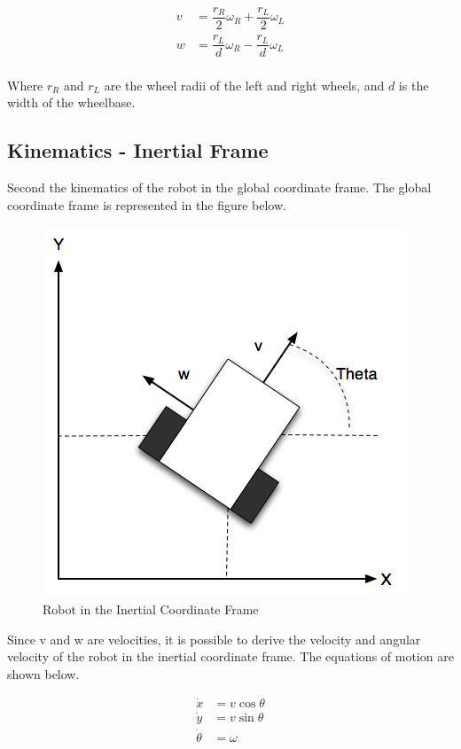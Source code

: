 \documentclass[10pt]{amsart}
\begin{document}
\begin{equation}
  \begin{aligned}
    v &= \dfrac{r_R}{2} \omega_R + \dfrac{r_L}{2} \omega_L \\
    w &= \dfrac{r_L}{d} \omega_R - \dfrac{r_L}{d} \omega_L
  \end{aligned}
\end{equation}
\\
Where $r_{R}$ and $r_{L}$ are the wheel radii of the left and right wheels, and $d$ is the width of the wheelbase.


\subsection{Kinematics - Inertial Frame}
Second the kinematics of the robot in the global coordinate frame.  The global coordinate frame is represented in the figure below.

\begin{figure}[h]
 \centering
 \includegraphics[scale=0.4,keepaspectratio=true]{./global.png}
 \caption{Robot in the Inertial Coordinate Frame}
 \label{fig:global}
\end{figure}

Since v and w are velocities, it is possible to derive the velocity and angular velocity of the robot in the inertial coordinate frame.  The equations of motion are shown below.

\begin{equation}
\begin{align}
\dot{x} &= v \cos{\theta} \\
\dot{y} &= v \sin{\theta} \\
\dot{\theta} &= \omega
\end{align}
\end{equation}
\end{document}
